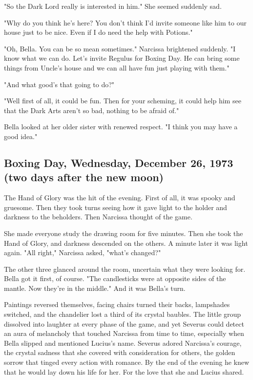 "So the Dark Lord really is interested in him." She seemed suddenly sad.

"Why do you think he's here? You don't think I'd invite someone like him to our house just to be nice. Even if I do need the help with Potions."

"Oh, Bella. You can be so mean sometimes." Narcissa brightened suddenly. "I know what we can do. Let's invite Regulus for Boxing Day. He can bring some things from Uncle's house and we can all have fun just playing with them."

"And what good's that going to do?"

"Well first of all, it could be fun. Then for your scheming, it could help him see that the Dark Arts aren't so bad, nothing to be afraid of."

Bella looked at her older sister with renewed respect. "I think you may have a good idea."

\subsection{Boxing Day, Wednesday, December 26, 1973 (two days after the new moon)}

The Hand of Glory was the hit of the evening. First of all, it was spooky and gruesome. Then they took turns seeing how it gave light to the holder and darkness to the beholders. Then Narcissa thought of the game.

She made everyone study the drawing room for five minutes. Then she took the Hand of Glory, and darkness descended on the others. A minute later it was light again. "All right," Narcissa asked, "what's changed?"

The other three glanced around the room, uncertain what they were looking for. Bella got it first, of course. "The candlesticks were at opposite sides of the mantle. Now they're in the middle." And it was Bella's turn.

Paintings reversed themselves, facing chairs turned their backs, lampshades switched, and the chandelier lost a third of its crystal baubles. The little group dissolved into laughter at every phase of the game, and yet Severus could detect an aura of melancholy that touched Narcissa from time to time, especially when Bella slipped and mentioned Lucius's name. Severus adored Narcissa's courage, the crystal sadness that she covered with consideration for others, the golden sorrow that tinged every action with romance. By the end of the evening he knew that he would lay down his life for her. For the love that she and Lucius shared.


